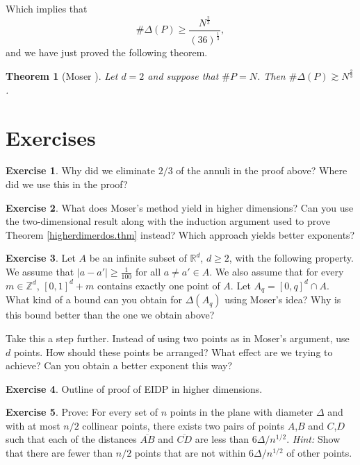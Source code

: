 \documentclass[]{stml-l}
\numberwithin{equation}{chapter}
\theoremstyle{plain}
\newtheorem{theorem}[equation]{Theorem}
\theoremstyle{definition}
\newtheorem{exercise}{Exercise}[chapter]
\theoremstyle{remark}
\begin{document}
Which implies that
\begin{equation}
\# \Delta(P) \ge
\frac{N^{\frac{2}{3}}}{{(36)}^{\frac{1}{3}}},
\end{equation}
and we
have just proved the following theorem.

\begin{theorem}[Moser \cite{Mos}]  \label{moser.thm}
Let $d=2$ and suppose that $\# P=N$. Then $\# \Delta(P) \gtrsim N^{\frac{2}{3}}$.

 \end{theorem}

\bigskip

\section*{Exercises}

\begin{exercise} \label{ex2.1}
Why did we eliminate $2/3$ of the annuli
in the proof above? Where did we use this in the proof?
\end{exercise}

\begin{exercise} \label{ex2.2}
What does Moser's method yield in higher
dimensions? Can you use the two-dimensional result along with the
induction argument used to prove Theorem \ref{higherdimerdos.thm} instead? Which
approach yields better exponents? \end{exercise}

\begin{exercise} \label{ex2.3}
Let $A$ be an infinite subset of ${\mathbb
R}^d$, $d \ge 2$, with the following property. We assume that
$|a-a'| \ge \frac{1}{100}$ for all $a \not=a' \in A$. We also
assume that for every $m \in \mathbb{Z}^d$, ${[0,1]}^d+m$ contains
exactly one point of $A$. Let $A_q={[0,q]}^d \cap A$. What kind of
a bound can you obtain for $\Delta(A_q)$ using Moser's idea? Why
is this bound better than the one we obtain above?

Take this a step further. Instead of using two points as in
Moser's argument, use $d$ points. How should these points be
arranged? What effect are we trying to achieve? Can you obtain a
better exponent this way? \end{exercise}

\begin{exercise} \label{ex2.4}
Outline of proof of EIDP in higher
dimensions.
\end{exercise}


\begin{exercise} \label{obs1}
Prove: 
For every set of $n$ points in the plane with diameter $\Delta$ and with at most $n/2$ collinear points, there exists two pairs of points $A$,$B$ and $C$,$D$ such that each of the distances $\overline{AB}$ and $\overline{CD}$ are less than $6\Delta/n^{1/2}$.
{\it Hint:}  Show that there are fewer than $n/2$ points that are not within $6\Delta/n^{1/2}$ of other points.
\end{exercise}
\end{document}
